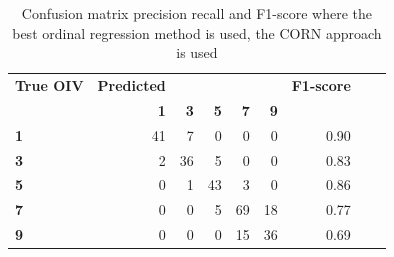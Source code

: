 \documentclass[english]{article}
\begin{document}
\begin{table}[H]
\centering
\caption{Confusion matrix precision recall and F1-score where the best ordinal regression method is used, the CORN approach is used}
\label{tab:dtafracevol}
\begin{tabular}{lrrrrrrrr}
\toprule
\textbf{True OIV} & \textbf{Predicted} &&&&  & \textbf{F1-score}\\
{} &   \textbf{1} &   \textbf{3} &   \textbf{5} &   \textbf{7} &   \textbf{9}&&\\
\midrule
\textbf{1} &  41 &   7 &   0 &   0 &   0    & 0.90           \\
\textbf{3} &   2 &  36 &   5 &   0 &   0    & 0.83     \\
\textbf{5} &   0 &   1 &  43 &   3 &   0    & 0.86      \\
\textbf{7} &   0 &   0 &   5 &  69 &  18    & 0.77     \\
\textbf{9} &   0 &   0 &   0 &  15 &  36    & 0.69     \\
\bottomrule
\end{tabular}
\end{table}


\end{document}
